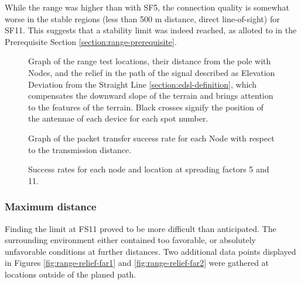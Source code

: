 While the range was higher than with SF5, the connection quality is somewhat worse in the stable regions (less than 500 m distance, direct line-of-sight) for SF11. This suggests that a stability limit was indeed reached, as alloted to in the Prerequisite Section \ref{section:range-prerequisite}.

\begin{figure}[p]
    \centering
    \subfloat[SF11]{} \hfil
    \subfloat[SF5]{}
    \caption{\label{fig:range-relief}Graph of the range test locations, their distance from the pole with Nodes, and the relief in the path of the signal described as Elevation Deviation from the Straight Line \ref{section:edsl-definition}, which compensates the downward slope of the terrain and brings attention to the features of the terrain. Black crosses signify the position of the antennae of each device for each spot number.}
\end{figure}

\begin{figure}[p]
    \centering
    \subfloat[SF11]{} \hfil
    \subfloat[SF5]{}
    \caption{\label{fig:range-results}Graph of the packet transfer success rate for each Node with respect to the transmission distance.}
\end{figure}

\begin{figure}[p]
\begin{minipage}[t]{.45\textwidth}
    \vspace{0pt}
    
\end{minipage}
\begin{minipage}[t]{.45\textwidth}
    \vspace{0pt}
            
\end{minipage}
\caption{\label{table:range-results}Success rates for each node and location at spreading factors 5 and 11.}
\end{figure} 

\subsubsection{Maximum distance}
Finding the limit at FS11 proved to be more difficult than anticipated. The surrounding environment either contained too favorable, or absolutely unfavorable conditions at further distances. Two additional data points displayed in Figures \ref{fig:range-relief-far1} and \ref{fig:range-relief-far2} were gathered at locations outside of the planed path.

